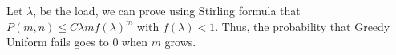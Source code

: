 \documentclass[10pt, conference, letterpaper]{algotel}
\begin{document}
Let $\lambda$, be the load, we can prove using Stirling formula that
$P(m,n) \leq C \lambda m f(\lambda)^m$ with $f(\lambda) < 1$. Thus, the probability that Greedy Uniform fails goes to $0$ when $m$ grows. 



 
\end{document}
